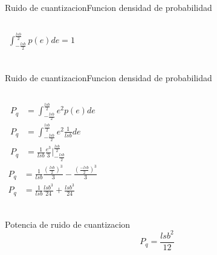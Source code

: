 \begin{darkframes}
\begin{frame}{Ruido de cuantizacion}{Funcion densidad de probabilidad}
\begin{columns}[onlytextwidth]
         \begin{align*}
            \int^\frac{lsb}{2}_{-\frac{lsb}{2}} p(e) de = 1 \\
         \end{align*}
      \end{columns}
      \vfill
   \end{frame}
   \begin{frame}{Ruido de cuantizacion}{Funcion densidad de probabilidad}
      \begin{columns}[onlytextwidth]
         \begin{align*}
            P_q &= \int^\frac{lsb}{2}_{-\frac{lsb}{2}} e^2 p(e) de \\
            P_q &= \int^\frac{lsb}{2}_{-\frac{lsb}{2}} e^2 \frac{1}{lsb} de \\
            P_q &= \frac{1}{lsb} \frac{e^3}{3} \Big\rvert^{\frac{lsb}{2}}_{-\frac{lsb}{2}}
         \end{align*}
         \begin{align*}
            P_q &= \frac{1}{lsb} \frac{(\frac{lsb}{2})^3}{3} - \frac{(\frac{-lsb}{2})^3}{3} \\
            P_q &= \frac{1}{lsb} \frac{lsb^3}{24} + \frac{lsb^3}{24} \\
         \end{align*}
      \end{columns}
      \begin{block}{Potencia de ruido de cuantizacion}
         \begin{equation}
            P_q = \frac{lsb^2}{12}
         \end{equation}
      \end{block}
      \vfill
   \end{frame}

\end{darkframes}

